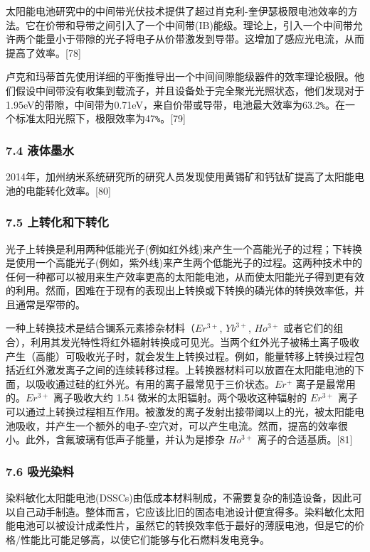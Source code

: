 太阳能电池研究中的中间带光伏技术提供了超过肖克利-奎伊瑟极限电池效率的方法。它在价带和导带之间引入了一个中间带(IB)能级。理论上，引入一个中间带允许两个能量小于带隙的光子将电子从价带激发到导带。这增加了感应光电流，从而提高了效率。[78]

卢克和玛蒂首先使用详细的平衡推导出一个中间间隙能级器件的效率理论极限。他们假设中间带没有收集到载流子，并且设备处于完全聚光光照状态，他们发现对于1.95eV的带隙，中间带为0.71eV，来自价带或导带，电池最大效率为63.2\verb|%|。在一个标准太阳光照下，极限效率为47\verb|%|。[79]

\subsubsection{7.4 液体墨水}

2014年，加州纳米系统研究所的研究人员发现使用黄锡矿和钙钛矿提高了太阳能电池的电能转化效率。[80]

\subsubsection{7.5 上转化和下转化}

光子上转换是利用两种低能光子(例如红外线)来产生一个高能光子的过程；下转换是使用一个高能光子(例如，紫外线)来产生两个低能光子的过程。这两种技术中的任何一种都可以被用来生产效率更高的太阳能电池，从而使太阳能光子得到更有效的利用。然而，困难在于现有的表现出上转换或下转换的磷光体的转换效率低，并且通常是窄带的。

一种上转换技术是结合镧系元素掺杂材料（$Er^{3+}$, $Yb^{3+}$, $Ho^{3+}$ 或者它们的组合），利用其发光特性将红外辐射转换成可见光。当两个红外光子被稀土离子吸收产生（高能）可吸收光子时，就会发生上转换过程。例如，能量转移上转换过程包括近红外激发离子之间的连续转移过程。上转换器材料可以放置在太阳能电池的下面，以吸收通过硅的红外光。有用的离子最常见于三价状态。$Er^{+}$ 离子是最常用的。$Er^{3+}$ 离子吸收大约 1.54 微米的太阳辐射。两个吸收这种辐射的 $Er^{3+}$ 离子可以通过上转换过程相互作用。被激发的离子发射出接带阈以上的光，被太阳能电池吸收，并产生一个额外的电子-空穴对，可以产生电流。然而，提高的效率很小。此外，含氟玻璃有低声子能量，并认为是掺杂 $Ho^{3+}$ 离子的合适基质。[81]

\subsubsection{7.6 吸光染料}

染料敏化太阳能电池(DSSCs)由低成本材料制成，不需要复杂的制造设备，因此可以自己动手制造。整体而言，它应该比旧的固态电池设计便宜得多。染料敏化太阳能电池可以被设计成柔性片，虽然它的转换效率低于最好的薄膜电池，但是它的价格/性能比可能足够高，以使它们能够与化石燃料发电竞争。

